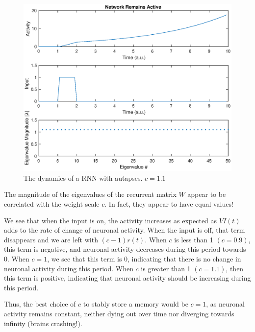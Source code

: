 \documentclass[11pt, oneside]{article}
\begin{document}
\begin{figure}[ht!]
\includegraphics[width=1\textwidth]{RNN11.eps}
\caption{The dynamics of a RNN with autapses. $c = 1.1$}
\label{fig:RNN11}
\end{figure}

The magnitude of the eigenvalues of the recurrent matrix $W$ appear to be correlated with the weight scale $c$. In fact, they appear to have equal values!

We see that when the input is on, the activity increases as expected as $VI(t)$ adds to the rate of change of neuronal activity. When the input is off, that term disappears and we are left with $(c-1)r(t)$. When $c$ is less than 1 $(c=0.9)$, this term is negative, and neuronal activity decreases during this period towards 0. When $c = 1$, we see that this term is 0, indicating that there is no change in neuronal activity during this period. When $c$ is greater than 1 $(c=1.1)$, then this term is positive, indicating that neuronal activity should be increasing during this period.

Thus, the best choice of $c$ to stably store a memory would be $c=1$, as neuronal activity remains constant, neither dying out over time nor diverging towards infinity (brains crashing!).
\end{document}
